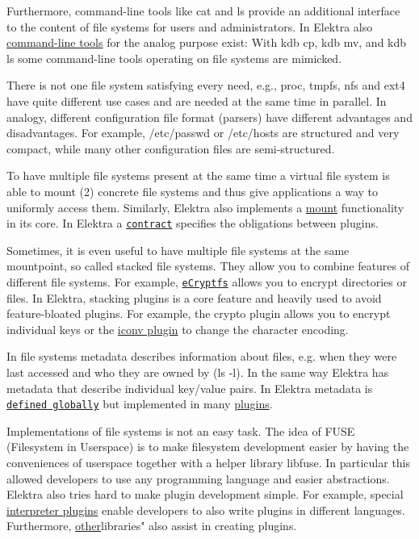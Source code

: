 Furthermore, command-\/line tools like {\ttfamily cat} and {\ttfamily ls} provide an additional interface to the content of file systems for users and administrators. In Elektra also \hyperlink{md_doc_help_kdb-introduction_doc_help_kdb-introduction_md}{command-\/line tools} for the analog purpose exist\+: With {\ttfamily kdb cp}, {\ttfamily kdb mv}, and {\ttfamily kdb ls} some command-\/line tools operating on file systems are mimicked.

There is not one file system satisfying every need, e.\+g., {\ttfamily proc}, {\ttfamily tmpfs}, {\ttfamily nfs} and {\ttfamily ext4} have quite different use cases and are needed at the same time in parallel. In analogy, different configuration file format (parsers) have different advantages and disadvantages. For example, {\ttfamily /etc/passwd} or {\ttfamily /etc/hosts} are structured and very compact, while many other configuration files are semi-\/structured.

To have multiple file systems present at the same time a virtual file system is able to mount (2) concrete file systems and thus give applications a way to uniformly access them. Similarly, Elektra also implements a \hyperlink{md_doc_help_elektra-mounting_doc_help_elektra-mounting_md}{mount} functionality in its core. In Elektra a \href{/home/markus/Projekte/Elektra/current/doc/CONTRACT.ini}{\tt contract} specifies the obligations between plugins.

Sometimes, it is even useful to have multiple file systems at the same mountpoint, so called {\ttfamily stacked} file systems. They allow you to combine features of different file systems. For example, \href{https://wiki.archlinux.org/index.php/ECryptfs}{\tt e\+Cryptfs} allows you to encrypt directories or files. In Elektra, stacking plugins is a core feature and heavily used to avoid feature-\/bloated plugins. For example, the crypto plugin allows you to encrypt individual keys or the \hyperlink{md_src_plugins_iconv_README_src_plugins_iconv_README_md}{iconv plugin} to change the character encoding.

In file systems metadata describes information about files, e.\+g. when they were last accessed and who they are owned by ({\ttfamily ls -\/l}). In the same way Elektra has metadata that describe individual key/value pairs. In Elektra metadata is \href{/home/markus/Projekte/Elektra/current/doc/METADATA.ini}{\tt defined globally} but implemented in many \hyperlink{md_src_plugins_README_src_plugins_README_md}{plugins}.

Implementations of file systems is not an easy task. The idea of F\+U\+S\+E (Filesystem in Userspace) is to make filesystem development easier by having the conveniences of userspace together with a helper library {\ttfamily libfuse}. In particular this allowed developers to use any programming language and easier abstractions. Elektra also tries hard to make plugin development simple. For example, special \hyperlink{md_src_plugins_README_src_plugins_README_md}{interpreter plugins} enable developers to also write plugins in different languages. Furthermore, \hyperlink{md_src_libs_README_src_libs_README_md}{other}libraries" also assist in creating plugins.

